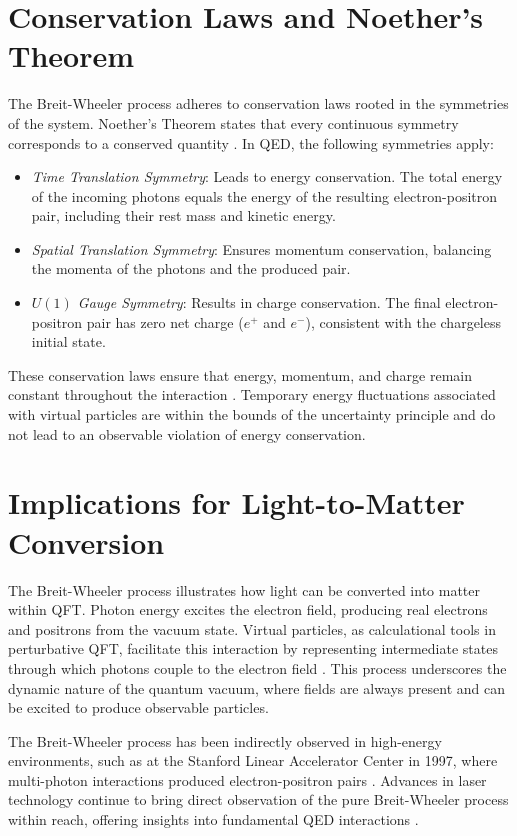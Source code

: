 \documentclass[aps,prl,twocolumn,superscriptaddress]{revtex4-2}
\begin{document}
	\section{Conservation Laws and Noether's Theorem}
	The Breit-Wheeler process adheres to conservation laws rooted in the symmetries of the system. Noether's Theorem states that every continuous symmetry corresponds to a conserved quantity \citep{Noether1918}. In QED, the following symmetries apply:
	\begin{itemize}
		\item \textit{Time Translation Symmetry}: Leads to energy conservation. The total energy of the incoming photons equals the energy of the resulting electron-positron pair, including their rest mass and kinetic energy.
		\item \textit{Spatial Translation Symmetry}: Ensures momentum conservation, balancing the momenta of the photons and the produced pair.
		\item \textit{\(U(1)\) Gauge Symmetry}: Results in charge conservation. The final electron-positron pair has zero net charge (\(e^+\) and \(e^-\)), consistent with the chargeless initial state.
	\end{itemize}
	
	These conservation laws ensure that energy, momentum, and charge remain constant throughout the interaction \citep{Goldstein1980}. Temporary energy fluctuations associated with virtual particles are within the bounds of the uncertainty principle and do not lead to an observable violation of energy conservation.
	
	\section{Implications for Light-to-Matter Conversion}
	The Breit-Wheeler process illustrates how light can be converted into matter within QFT. Photon energy excites the electron field, producing real electrons and positrons from the vacuum state. Virtual particles, as calculational tools in perturbative QFT, facilitate this interaction by representing intermediate states through which photons couple to the electron field \citep{Landau1975}. This process underscores the dynamic nature of the quantum vacuum, where fields are always present and can be excited to produce observable particles.
	
	The Breit-Wheeler process has been indirectly observed in high-energy environments, such as at the Stanford Linear Accelerator Center in 1997, where multi-photon interactions produced electron-positron pairs \citep{Burke1997}. Advances in laser technology continue to bring direct observation of the pure Breit-Wheeler process within reach, offering insights into fundamental QED interactions \citep{Pike2014}.
	
\end{document}
